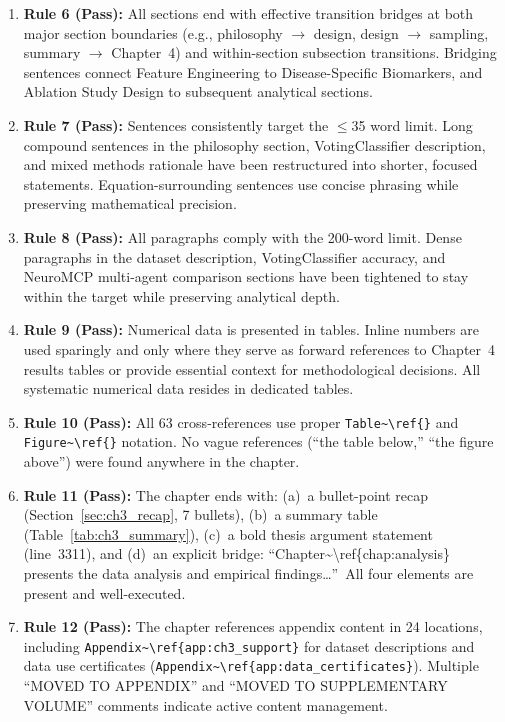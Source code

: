 \begin{enumerate}[nosep, leftmargin=*]
\item \textbf{Rule 6 (Pass):} All sections end with effective transition bridges at both major section boundaries (e.g., philosophy $\to$ design, design $\to$ sampling, summary $\to$ Chapter~4) and within-section subsection transitions. Bridging sentences connect Feature Engineering to Disease-Specific Biomarkers, and Ablation Study Design to subsequent analytical sections.

\item \textbf{Rule 7 (Pass):} Sentences consistently target the $\leq$35 word limit. Long compound sentences in the philosophy section, VotingClassifier description, and mixed methods rationale have been restructured into shorter, focused statements. Equation-surrounding sentences use concise phrasing while preserving mathematical precision.

\item \textbf{Rule 8 (Pass):} All paragraphs comply with the 200-word limit. Dense paragraphs in the dataset description, VotingClassifier accuracy, and NeuroMCP multi-agent comparison sections have been tightened to stay within the target while preserving analytical depth.

\item \textbf{Rule 9 (Pass):} Numerical data is presented in tables. Inline numbers are used sparingly and only where they serve as forward references to Chapter~4 results tables or provide essential context for methodological decisions. All systematic numerical data resides in dedicated tables.

\item \textbf{Rule 10 (Pass):} All 63 cross-references use proper \texttt{Table\textasciitilde\textbackslash ref\{\}} and \texttt{Figure\textasciitilde\textbackslash ref\{\}} notation. No vague references (``the table below,'' ``the figure above'') were found anywhere in the chapter.

\item \textbf{Rule 11 (Pass):} The chapter ends with: (a)~a bullet-point recap (Section~\ref{sec:ch3_recap}, 7 bullets), (b)~a summary table (Table~\ref{tab:ch3_summary}), (c)~a bold thesis argument statement (line~3311), and (d)~an explicit bridge: ``Chapter\textasciitilde\textbackslash ref\{chap:analysis\} presents the data analysis and empirical findings\ldots''\ All four elements are present and well-executed.

\item \textbf{Rule 12 (Pass):} The chapter references appendix content in 24 locations, including \texttt{Appendix\textasciitilde\textbackslash ref\{app:ch3\_support\}} for dataset descriptions and data use certificates (\texttt{Appendix\textasciitilde\textbackslash ref\{app:data\_certificates\}}). Multiple ``MOVED TO APPENDIX'' and ``MOVED TO SUPPLEMENTARY VOLUME'' comments indicate active content management.


\end{enumerate}
